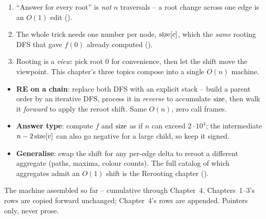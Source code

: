 \begin{insightbox}
\begin{enumerate}[nosep, leftmargin=1.6em]
  \item ``Answer for every root'' is \emph{not} $n$ traversals -- a root change across one
        edge is an $O(1)$ edit ().
  \item The whole trick needs one number per node, $\operatorname{size}[c]$, which the \emph{same} rooting
        DFS that gave $f(0)$ already computed ().
  \item Rooting is a \emph{view}: pick root $0$ for convenience, then let the shift move the
        viewpoint. This chapter's three topics compose into a single $O(n)$ machine.
\end{enumerate}
\end{insightbox}

\begin{hardeningbox}
\begin{itemize}[nosep, leftmargin=1.4em]
  \item \textbf{RE on a chain}: replace both DFS with an explicit stack -- build a parent
        order by an iterative DFS, process it in \emph{reverse} to accumulate $\operatorname{size}$, then
        walk it \emph{forward} to apply the reroot shift. Same $O(n)$, zero call frames.
  \item \textbf{Answer type}: compute $f$ and $\operatorname{size}$ as  if $n$ can exceed
        $2\cdot10^{4}$; the intermediate $n - 2\operatorname{size}[v]$ can also go negative for a large
        child, so keep it signed.
  \item \textbf{Generalise}: swap the shift for any per-edge delta to reroot a different
        aggregate (paths, maxima, colour counts). The full catalog of which aggregates admit
        an $O(1)$ shift is the Rerooting chapter ().
\end{itemize}
\end{hardeningbox}


The machine assembled so far -- cumulative through Chapter~4. Chapters~1--3's rows are
copied forward unchanged; Chapter~4's rows are appended. Pointers only, never prose.

